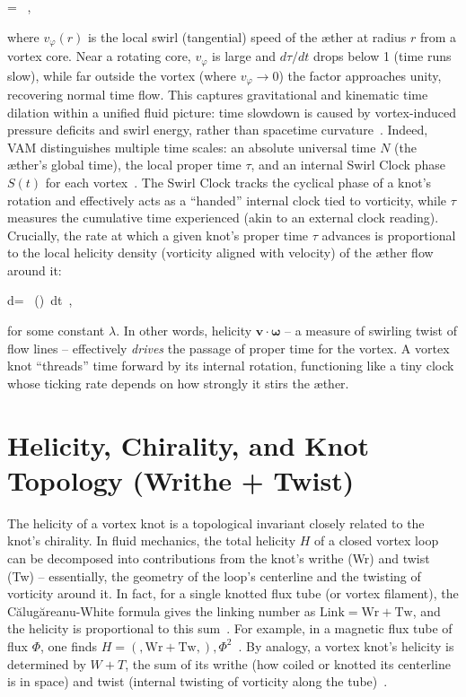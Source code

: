  \;=\; \ , \label{eq:swirl-time}


where $v_{\varphi}(r)$ is the local swirl (tangential) speed of the æther at radius $r$ from a vortex core. Near a rotating core, $v_{\varphi}$ is large and $d\tau/dt$ drops below 1 (time runs slow), while far outside the vortex (where $v_{\varphi}\to 0$) the factor approaches unity, recovering normal time flow. This captures gravitational and kinematic time dilation within a unified fluid picture: time slowdown is caused by vortex-induced pressure deficits and swirl energy, rather than spacetime curvature~\cite{iskandarani2025vam2}. Indeed, VAM distinguishes multiple time scales: an absolute universal time $N$ (the æther’s global time), the local proper time $\tau$, and an internal Swirl Clock phase $S(t)$ for each vortex~\cite{iskandarani2025vam2}. The Swirl Clock tracks the cyclical phase of a knot’s rotation and effectively acts as a “handed” internal clock tied to vorticity, while $\tau$ measures the cumulative time experienced (akin to an external clock reading). Crucially, the rate at which a given knot’s proper time $\tau$ advances is proportional to the local helicity density (vorticity aligned with velocity) of the æther flow around it:


 d\tau \;=\; \lambda\, (\cdot\boldsymbol{\omega})\, dt\ , \label{eq:helicity-time}


for some constant $\lambda$. In other words, helicity $\mathbf{v}\cdot\boldsymbol{\omega}$ – a measure of swirling twist of flow lines – effectively \textit{drives} the passage of proper time for the vortex. A vortex knot “threads” time forward by its internal rotation, functioning like a tiny clock whose ticking rate depends on how strongly it stirs the æther.


\section*{Helicity, Chirality, and Knot Topology (Writhe + Twist)}

The helicity of a vortex knot is a topological invariant closely related to the knot’s chirality. In fluid mechanics, the total helicity $H$ of a closed vortex loop can be decomposed into contributions from the knot’s writhe (Wr) and twist (Tw) – essentially, the geometry of the loop’s centerline and the twisting of vorticity around it. In fact, for a single knotted flux tube (or vortex filament), the Călugăreanu-White formula gives the linking number as $\text{Link} = \text{Wr} + \text{Tw}$, and the helicity is proportional to this sum~\cite{knot_theroy_in_fluid}. For example, in a magnetic flux tube of flux $\Phi$, one finds $H = (,\text{Wr} + \text{Tw},),\Phi^2$~\cite{knot_theroy_in_fluid}. By analogy, a vortex knot’s helicity is determined by $W+T$, the sum of its writhe (how coiled or knotted its centerline is in space) and twist (internal twisting of vorticity along the tube)~\cite{knot_theroy_in_fluid}.


